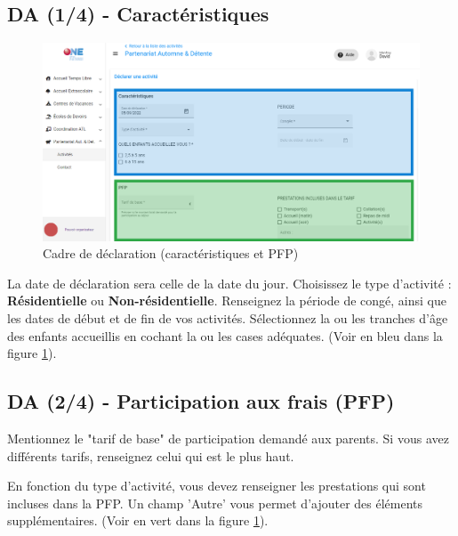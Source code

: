 \subsection{DA (1/4) - Caractéristiques}

\begin{figure}[ht!]
    \centering
    \includegraphics[width=13cm]{Images/pad/da1.png}
    \caption{Cadre de déclaration (caractéristiques et PFP)}
    \label{fig:pad_da1}
\end{figure}

La date de déclaration sera celle de la date du jour. Choisissez le type d'activité : \textbf{Résidentielle} ou \textbf{Non-résidentielle}. Renseignez la période de congé, ainsi que les dates de début et de fin de vos activités. Sélectionnez la ou les tranches d'âge des enfants accueillis en cochant la ou les cases adéquates. (Voir en bleu dans la figure \ref{fig:pad_da1}).



\subsection{DA (2/4) - Participation aux frais (PFP)}
Mentionnez le "tarif de base" de participation demandé aux parents. Si vous avez différents tarifs, renseignez celui qui est le plus haut.

En fonction du type d'activité, vous devez renseigner les prestations qui sont incluses dans la PFP. Un champ 'Autre' vous permet d'ajouter des éléments supplémentaires. (Voir en vert dans la figure \ref{fig:pad_da1}). 


